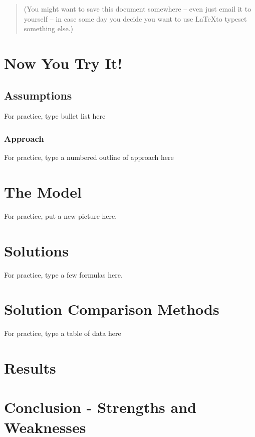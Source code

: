 \documentclass[12pt]{article}   %
\begin{document}
\bigskip\bigskip

\begin{quote}
(You might want to save this document somewhere -- even just email it to yourself -- in
case some day you decide you want to use \LaTeX to typeset something else.)
\end{quote}


\newpage

\section{Now You Try It!}

\subsection{Assumptions}

For practice, type bullet list here

\subsubsection{Approach}

For practice, type a numbered outline of approach here

\section{The Model}

For practice, put a new picture here.

\section{Solutions}

For practice, type a few formulas here.

\section{Solution Comparison Methods}

For practice, type a table of data here

\section{Results}

\section{Conclusion - Strengths and Weaknesses}
\end{document}

